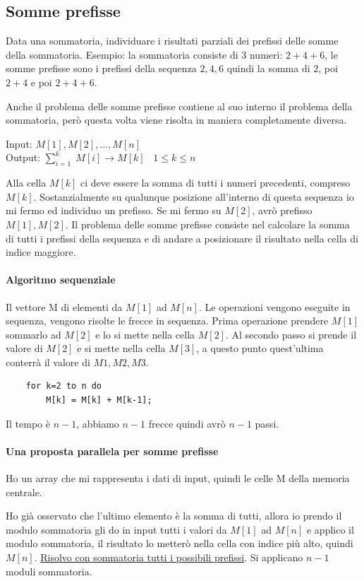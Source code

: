 \subsection{Somme prefisse}
Data una sommatoria, individuare i risultati parziali dei prefissi delle somme della sommatoria. Esempio: la sommatoria consiste di $3$ numeri: $2+4+6$, le somme prefisse sono i prefissi della sequenza $2, 4, 6$ quindi la somma di $2$, poi $2+4$ e poi $2+4+6$.

Anche il problema delle somme prefisse contiene al suo interno il problema della sommatoria, però questa volta viene risolta in maniera completamente diversa.

Input: $M[1], M[2], \dots , M[n]$\\
Output: $\sum_{i=1}^k\;M[i] \rightarrow M[k]\;\;\; 1\leq k\leq n$

Alla cella $M[k]$ ci deve essere la somma di tutti i numeri precedenti, compreso $M[k]$. Sostanzialmente su qualunque posizione all'interno di questa sequenza io mi fermo ed individuo un prefisso. Se mi fermo su $M[2]$, avrò prefisso $M[1], M[2]$. Il problema delle somme prefisse consiste nel calcolare la somma di tutti i prefissi della sequenza e di andare  a posizionare il risultato nella cella di indice maggiore.

\paragraph{Algoritmo sequenziale}
Il vettore M di elementi da $M[1]$ ad $M[n]$.
Le operazioni vengono eseguite in sequenza, vengono risolte le frecce in sequenza. Prima operazione prendere $M[1]$ sommarlo ad $M[2]$ e lo si mette nella cella $M[2]$. Al secondo passo si prende il valore di $M[2]$ e si mette nella cella $M[3]$, a questo punto quest'ultima conterrà il valore di $M1, M2, M3$. 

\begin{lstlisting}
    for k=2 to n do
        M[k] = M[k] + M[k-1];
\end{lstlisting}

Il tempo è $n-1$, abbiamo $n-1$ frecce quindi avrò $n-1$ passi.

\paragraph{Una proposta parallela per somme prefisse} Ho un array che mi rappresenta i dati di input, quindi le celle M della memoria centrale.

Ho già osservato che l'ultimo elemento è la somma di tutti, allora io prendo il modulo sommatoria gli do in input tutti i valori da $M[1]$ ad $M[n]$ e applico il modulo sommatoria, il risultato lo metterò nella cella con indice più alto, quindi $M[n]$. \uline{Risolvo con sommatoria tutti i possibili prefissi}. Si applicano $n-1$ moduli sommatoria.

